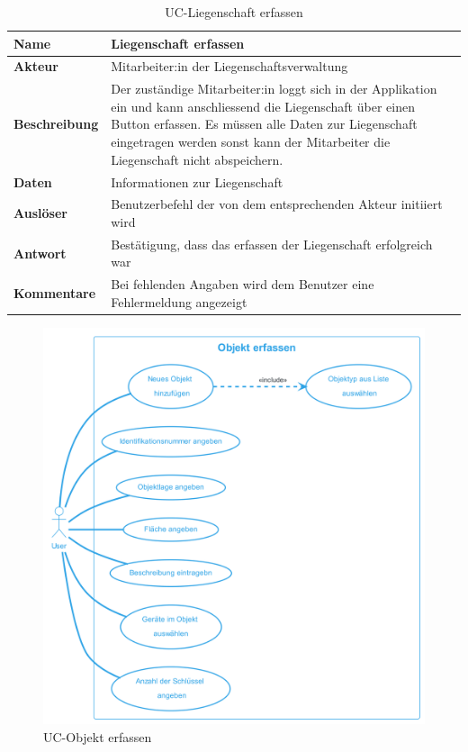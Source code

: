 \vspace*{-1cm}

\begin{table}[H]
  \centering
  \settowidth{}
  \setlength\extrarowheight{2pt}
  \begin{tabulary}{1.0\textwidth}{|a|m{14cm}|}
    \hline
    \textbf{Name}& Liegenschaft erfassen\\
    \hline
    \textbf{Akteur}& Mitarbeiter:in der Liegenschaftsverwaltung\\
    \hline 
    \textbf{Beschreibung} & Der zuständige Mitarbeiter:in loggt sich in der Applikation ein und kann anschliessend die Liegenschaft über einen Button erfassen. Es müssen alle Daten zur Liegenschaft eingetragen werden sonst kann der Mitarbeiter die Liegenschaft nicht abspeichern.\\
    \hline
    \textbf{Daten} & Informationen zur Liegenschaft\\
    \hline
    \textbf{Auslöser} & Benutzerbefehl der von dem entsprechenden Akteur initiiert wird\\
    \hline
    \textbf{Antwort} & Bestätigung, dass das erfassen der Liegenschaft erfolgreich war\\
    \hline
    \textbf{Kommentare} & Bei fehlenden Angaben wird dem Benutzer eine Fehlermeldung angezeigt\\
    \hline
  \end{tabulary}
  \caption{UC-Liegenschaft erfassen}
\end{table}

\begin{figure}[H]
  \begin{center}
    \includegraphics[width=0.8\linewidth]{content/diagrams/out/usecase/objektErfassen/ObjektErfassen.png}
    \caption{UC-Objekt erfassen}
  \end{center}
\end{figure}

